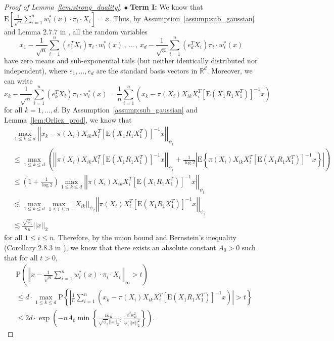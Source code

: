 \documentclass[ejsv2,noshowframe]{imsart}
\theoremstyle{plain}
\theoremstyle{definition}
\theoremstyle{remark}
\newcommand{\norm}[1]{\left|\left| #1 \right|\right|}
\begin{document}
\begin{proof}[Proof of Lemma~\ref{lem:strong_duality}]
	$\bullet$ \textbf{Term I:} We know that $\mathrm{E}\left[\frac{1}{\sqrt{n}} \sum_{i=1}^n w_i^*(x)\cdot\pi_i\cdot X_i \right]=x$. Thus, by Assumption~\ref{assump:sub_gaussian} and Lemma 2.7.7 in \cite{vershynin2018high}, all the random variables 
	$$x_1 - \frac{1}{\sqrt{n}} \sum_{i=1}^n \left(e_1^TX_i\right) \pi_i\cdot w_i^*(x)\,,\,...\,,\, x_d - \frac{1}{\sqrt{n}} \sum_{i=1}^n \left(e_d^TX_i\right) \pi_i\cdot w_i^*(x)$$
	have zero means and sub-exponential tails (but neither identically distributed nor independent), where $e_1,...,e_d$ are the standard basis vectors in $\mathbb{R}^d$. Moreover, we can write
	$$x_k - \frac{1}{\sqrt{n}} \sum_{i=1}^n \left(e_k^TX_i\right) \pi_i\cdot w_i^*(x) = \frac{1}{n}\sum_{i=1}^n\left(x_k - \pi(X_i)X_{ik} X_i^T \left[\mathrm{E}(X_1R_1X_1^T) \right]^{-1} x \right)$$
	for all $k=1,...,d$. By Assumption~\ref{assump:sub_gaussian} and Lemma~\ref{lem:Orlicz_prod}, we know that 
	\begin{align*}
		&\max_{1\leq k\leq d} \norm{x_k - \pi(X_i)X_{ik} X_i^T \left[\mathrm{E}(X_1R_1X_1^T) \right]^{-1} x}_{\psi_1} \\
		&\leq \max_{1\leq k\leq d}\left(\norm{\pi(X_i)X_{ik} X_i^T \left[\mathrm{E}(X_1R_1X_1^T) \right]^{-1} x}_{\psi_1} + \frac{1}{\log 2} \left|\mathrm{E}\left\{\pi(X_i)X_{ik} X_i^T \left[\mathrm{E}(X_1R_1X_1^T) \right]^{-1} x \right\} \right|\right)\\
		& \leq \left(1+\frac{1}{\log 2}\right) \max_{1\leq k\leq d} \norm{\pi(X_i)X_{ik} X_i^T \left[\mathrm{E}(X_1R_1X_1^T) \right]^{-1} x}_{\psi_1}\\
		&\lesssim \max_{1\leq k\leq d} \max_{1\leq i\leq n} \norm{X_{ik}}_{\psi_2}\norm{\pi(X_i)X_i^T \left[\mathrm{E}(X_1R_1X_1^T) \right]^{-1} x}_{\psi_2}\\
		&\lesssim \frac{\sqrt{\phi_1}}{\kappa_R} \norm{x}_2
	\end{align*}
	for all $1\leq i \leq n$. Therefore, by the union bound and Bernstein's inequality (Corollary 2.8.3 in \citealt{vershynin2018high}), we know that there exists an absolute constant $A_0>0$ such that for all $t>0$,
	\begin{align*}
		&\mathrm{P}\left(\norm{x - \frac{1}{\sqrt{n}} \sum_{i=1}^n w_i^*(x)\cdot \pi_i\cdot X_i}_{\infty} > t \right) \\
		& \leq d\cdot \max_{1\leq k\leq d} \mathrm{P}\left\{\left| \frac{1}{n}\sum_{i=1}^n\left(x_k - \pi(X_i)X_{ik} X_i^T \left[\mathrm{E}(X_1R_1X_1^T) \right]^{-1} x \right) \right| > t \right\}\\
		&\leq 2d \cdot \exp\left(-nA_0 \min\left\{\frac{t \kappa_R}{\sqrt{\phi_1}\norm{x}_2},\, \frac{t^2 \kappa_R^2}{\phi_1\norm{x}_2^2} \right\} \right).

\end{align*}
\end{proof}
\end{document}
